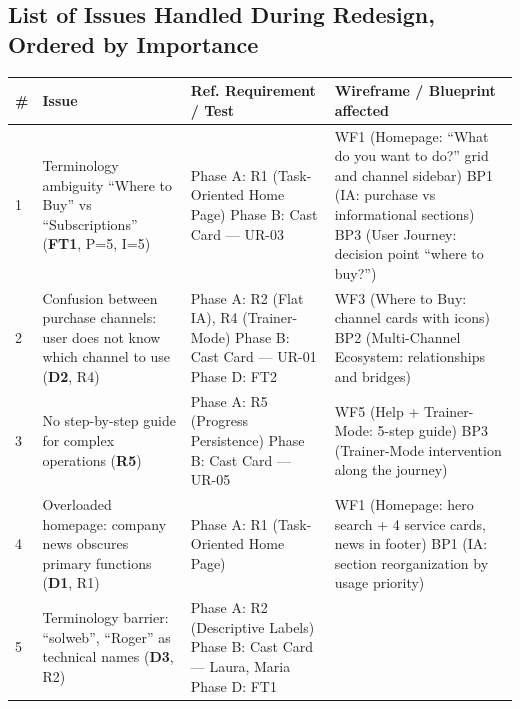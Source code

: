 ﻿\documentclass[11pt,a4paper]{article}
\begin{document}
\vspace{0.3cm}

\subsection*{List of Issues Handled During Redesign, Ordered by Importance}

\renewcommand{\arraystretch}{1.3}
\begin{longtable}{|p{0.8cm}|p{3.2cm}|p{3.3cm}|p{6.2cm}|}
\hline
\textbf{\#} & \textbf{Issue} & \textbf{Ref. Requirement / Test} & \textbf{Wireframe / Blueprint affected} \\
\hline
\endhead
1 & Terminology ambiguity ``Where to Buy'' vs ``Subscriptions'' (\textbf{FT1}, P=5, I=5) 
& Phase A: R1 (Task-Oriented Home Page) \newline Phase B: Cast Card --- UR-03
& WF1 (Homepage: ``What do you want to do?'' grid and channel sidebar) \newline BP1 (IA: purchase vs informational sections) \newline BP3 (User Journey: decision point ``where to buy?'') \\
\hline
2 & Confusion between purchase channels: user does not know which channel to use (\textbf{D2}, R4) 
& Phase A: R2 (Flat IA), R4 (Trainer-Mode) \newline Phase B: Cast Card --- UR-01 \newline Phase D: FT2
& WF3 (Where to Buy: channel cards with icons) \newline BP2 (Multi-Channel Ecosystem: relationships and bridges) \\
\hline
3 & No step-by-step guide for complex operations (\textbf{R5}) 
& Phase A: R5 (Progress Persistence) \newline Phase B: Cast Card --- UR-05
& WF5 (Help + Trainer-Mode: 5-step guide) \newline BP3 (Trainer-Mode intervention along the journey) \\
\hline
4 & Overloaded homepage: company news obscures primary functions (\textbf{D1}, R1) 
& Phase A: R1 (Task-Oriented Home Page)
& WF1 (Homepage: hero search + 4 service cards, news in footer) \newline BP1 (IA: section reorganization by usage priority) \\
\hline
5 & Terminology barrier: ``solweb'', ``Roger'' as technical names (\textbf{D3}, R2) 
& Phase A: R2 (Descriptive Labels) \newline Phase B: Cast Card --- Laura, Maria \newline Phase D: FT1

\end{longtable}
\end{document}

